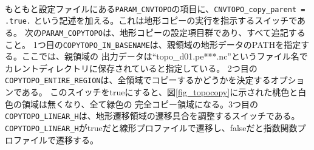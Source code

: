 \\

\noindent もともと設定ファイルにある\verb|PARAM_CNVTOPO|の項目に、\verb|CNVTOPO_copy_parent = .true.|
という記述を加える。これは地形コピーの実行を指示するスイッチである。
次の\verb|PARAM_COPYTOPO|は、地形コピーの設定項目群であり、すべて追記すること。
1つ目の\verb|COPYTOPO_IN_BASENAME|は、親領域の地形データのPATHを指定する。ここでは、親領域の
出力データは``topo\_d01.pe***.nc''というファイル名でカレントディレクトリに保存されていると指定している。
2つ目の\verb|COPYTOPO_ENTIRE_REGION|は、全領域でコピーするかどうかを決定するオプションである。
このスイッチをtrueにすると、図\ref{fig_topocopy}に示された桃色と白色の領域は無くなり、全て緑色の
完全コピー領域になる。3つ目の\verb|COPYTOPO_LINEAR_H|は、地形遷移領域の遷移具合を調整するスイッチである。
\verb|COPYTOPO_LINEAR_H|がtrueだと線形プロファイルで遷移し、falseだと指数関数プロファイルで遷移する。

